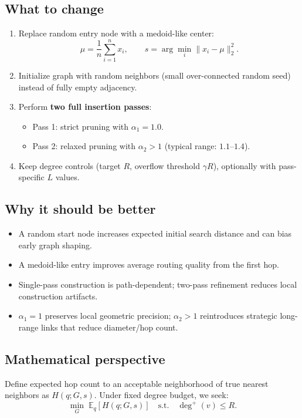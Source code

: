 \documentclass[11pt]{article}
\begin{document}
\subsection{What to change}
\begin{enumerate}[leftmargin=*]
    \item Replace random entry node with a medoid-like center:
    \begin{equation}
    \mu = \frac{1}{n}\sum_{i=1}^n x_i,\qquad s = \arg\min_i \lVert x_i - \mu \rVert_2^2.
    \end{equation}
    \item Initialize graph with random neighbors (small over-connected random seed) instead of fully empty adjacency.
    \item Perform \textbf{two full insertion passes}:
    \begin{itemize}[leftmargin=*]
        \item Pass 1: strict pruning with $\alpha_1 = 1.0$.
        \item Pass 2: relaxed pruning with $\alpha_2 > 1$ (typical range: $1.1$--$1.4$).
    \end{itemize}
    \item Keep degree controls (target $R$, overflow threshold $\gamma R$), optionally with pass-specific $L$ values.
\end{enumerate}

\subsection{Why it should be better}
\begin{itemize}[leftmargin=*]
    \item A random start node increases expected initial search distance and can bias early graph shaping.
    \item A medoid-like entry improves average routing quality from the first hop.
    \item Single-pass construction is path-dependent; two-pass refinement reduces local construction artifacts.
    \item $\alpha_1=1$ preserves local geometric precision; $\alpha_2>1$ reintroduces strategic long-range links that reduce diameter/hop count.
\end{itemize}

\subsection{Mathematical perspective}
Define expected hop count to an acceptable neighborhood of true nearest neighbors as $H(q;G,s)$. Under fixed degree budget, we seek:
\begin{equation}
\min_G\; \mathbb{E}_q[H(q;G,s)]\quad\text{s.t.}\quad \deg^+(v)\le R.
\end{equation}
\end{document}
